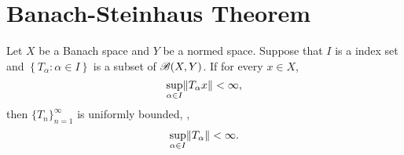 \section{Banach-Steinhaus Theorem}
\begin{thm}
\label{thm:banach_steinhaus_theorem}
Let $X$ be a Banach space and $Y$ be a normed space. 
Suppose that $I$ is a index set and $\left\{ T_\alpha: 
\alpha \in I \right\}$ is a subset of $\mathscr{B}(X, Y)$. 
If for every $x \in X$, 
\begin{equation*}
    \sup_{\alpha \in I} \norm{T_\alpha x} < \infty, 
\end{equation*}
then $\{ T_n \}_{n=1}^{\infty}$ is uniformly bounded, \ie, 
\begin{equation*}
    \sup_{\alpha \in I} \norm{T _\alpha} < \infty.
\end{equation*}
\end{thm}
